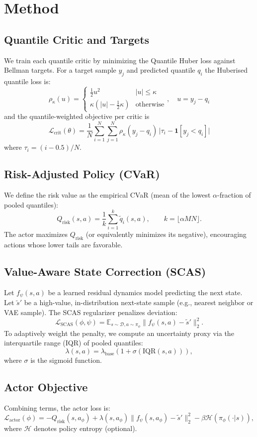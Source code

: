 \documentclass{article}
\begin{document}
\section{Method}
\subsection{Quantile Critic and Targets}
We train each quantile critic by minimizing the Quantile Huber loss against Bellman targets. For a target sample $y_j$ and predicted quantile $q_i$ the Huberised quantile loss is:
\[
\rho_\kappa(u) = 
\begin{cases}
\frac{1}{2}u^2 & |u|\le\kappa\\
\kappa(|u|-\tfrac{1}{2}\kappa) & \text{otherwise}
\end{cases},\quad u=y_j-q_i
\]
and the quantile-weighted objective per critic is
\[
\mathcal{L}_\text{crit}(\theta)=\frac{1}{N}\sum_{i=1}^N\sum_{j=1}^N \rho_\kappa(y_j-q_i)\,\big|\tau_i-\mathbf{1}[y_j<q_i]\big|
\]
where $\tau_i=(i-0.5)/N$.

\subsection{Risk-Adjusted Policy (CVaR)}
We define the risk value as the empirical CVaR (mean of the lowest $\alpha$-fraction of pooled quantiles):
\[
Q_{\text{risk}}(s,a)=\frac{1}{k}\sum_{i=1}^k \tilde q_i(s,a),\qquad k=\lfloor \alpha MN\rfloor.
\]
The actor maximizes $Q_{\text{risk}}$ (or equivalently minimizes its negative), encouraging actions whose lower tails are favorable.

\subsection{Value-Aware State Correction (SCAS)}
Let $f_\psi(s,a)$ be a learned residual dynamics model predicting the next state. Let $\tilde s'$ be a high-value, in-distribution next-state sample (e.g., nearest neighbor or VAE sample). The SCAS regularizer penalizes deviation:
\[
\mathcal{L}_\text{SCAS}(\phi,\psi)=\mathbb{E}_{s\sim\mathcal{D},a\sim\pi_\phi}\big\|f_\psi(s,a)-\tilde s'\big\|_2^2.
\]
To adaptively weight the penalty, we compute an uncertainty proxy via the interquartile range (IQR) of pooled quantiles:
\[
\lambda(s,a)=\lambda_\text{base}(1+\sigma(\mathrm{IQR}(s,a))),
\]
where $\sigma$ is the sigmoid function.

\subsection{Actor Objective}
Combining terms, the actor loss is:
\[
\mathcal{L}_\text{actor}(\phi)= -Q_\text{risk}(s,a_\phi) + \lambda(s,a_\phi)\|f_\psi(s,a_\phi)-\tilde s'\|_2^2 - \beta\mathcal{H}(\pi_\phi(\cdot|s)),
\]
where $\mathcal{H}$ denotes policy entropy (optional).
\end{document}
